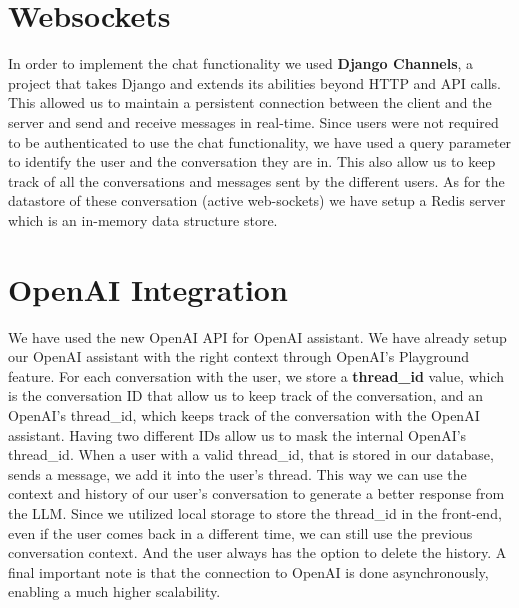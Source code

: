 \section{Websockets}
In order to implement the chat functionality we used \textbf{Django Channels}, a project that takes Django and extends its abilities beyond HTTP and API calls.
This allowed us to maintain a persistent connection between the client and the server and send and receive messages in real-time.
Since users were not required to be authenticated to use the chat functionality, we have used a query parameter to identify the user and the conversation they are in.
This also allow us to keep track of all the conversations and messages sent by the different users.
As for the datastore of these conversation (active web-sockets) we have setup a Redis server which is an in-memory data structure store.

\section{OpenAI Integration}
We have used the new OpenAI API for OpenAI assistant. We have already setup our OpenAI assistant with the right context through OpenAI's Playground feature. For each conversation with the user, we store a \textbf{thread\_id} value, which is the conversation ID that allow us to keep track of the conversation, and an OpenAI's thread\_id, which keeps track of the conversation with the OpenAI assistant. Having two different IDs allow us to mask the internal OpenAI's thread\_id.
When a user with a valid thread\_id, that is stored in our database, sends a message, we add it into the user's thread.
This way we can use the context and history of our user's conversation to generate a better response from the LLM.
Since we utilized local storage to store the thread\_id in the front-end, even if the user comes back in a different time, we can still use the previous conversation context. And the user always has the option to delete the history.
A final important note is that the connection to OpenAI is done asynchronously, enabling a much higher scalability.

